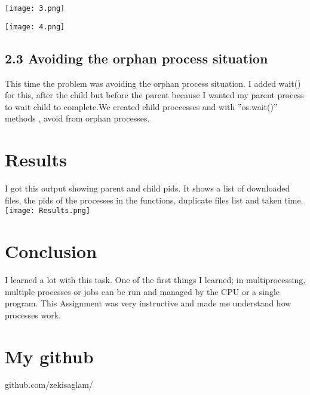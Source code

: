 \documentclass[onecolumn]{article}
\begin{document}
   \texttt{[image: 3.png]}
    
  \texttt{[image: 4.png]}
  
  
  
  

\subsection*{2.3 Avoiding the orphan process situation}

This time the problem was avoiding the orphan process situation. I added wait() for this, after
the child but before the parent because I wanted my parent process to wait child to complete.We created child proccesses and with ”os.wait()” methods , avoid from orphan processes.


\section{Results}
I got this output showing parent and child pids.
It shows a list of downloaded files, the pids of the processes in the functions, duplicate files list and taken time.
\texttt{[image: Results.png]}

\section{Conclusion}

I learned a lot with this task. One of the first things I learned; in multiprocessing, multiple processes or jobs can be run and managed by the CPU or a single program. 
This Assignment was very instructive and made me understand how processes work.

\section{My github}

github.com/zekisaglam/


\nocite{*}


\end{document}

